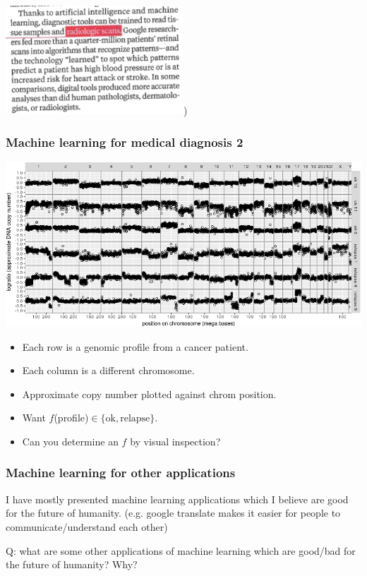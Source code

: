 \documentclass{beamer}
\begin{document}
\begin{frame}
{\includegraphics[width=0.5\textwidth]{retinal-scans/national-geographic-medicine-paragraph})
}

\end{frame}

\begin{frame}
  \frametitle{Machine learning for medical diagnosis 2}

\includegraphics[width=\textwidth]{neuroblastoma-ok-relapse}

\begin{itemize}
\item Each row is a genomic profile from a cancer patient.
\item Each column is a different chromosome.
\item Approximate copy number plotted against chrom position.
\item Want $f$(profile)$\in\{\text{ok},\text{relapse}\}$.
\item Can you determine an $f$ by visual inspection?
\end{itemize}

\end{frame}


\begin{frame}
  \frametitle{Machine learning for other applications}

  I have mostly presented machine learning applications which I
  believe are good for the future of humanity. (e.g. google translate
  makes it easier for people to communicate/understand each other)

  \vskip 1in

  Q: what are some other applications of machine learning which are
  good/bad for the future of humanity? Why?

\end{frame}
\end{document}
